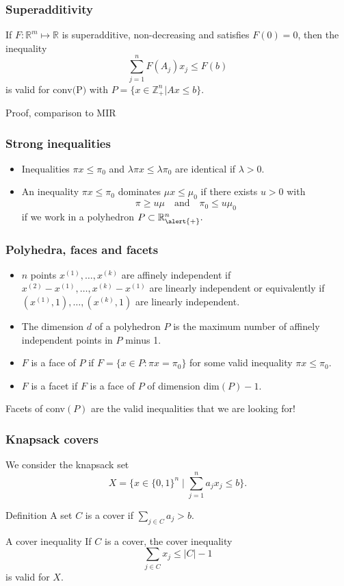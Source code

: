\documentclass[9pt,handout]{beamer}
\begin{document}
  \begin{frame} \frametitle{Superadditivity}
   \begin{block} {}
     If $F : \mathbb{R}^m \mapsto \mathbb{R}$ is superadditive, non-decreasing and satisfies $F(0) = 0$, then the inequality 
      $$ \sum_{j=1}^n F(A_j)x_j \leq F(b)$$ is valid for $\text{conv(P)}$ with $P = \{x\in \mathbb{Z}^n_+ | Ax \leq b\}$.
   \end{block}

   Proof, comparison to MIR

 \end{frame}


\begin{frame}
\frametitle{Strong inequalities}
\begin{itemize}
\item<1-> Inequalities $\pi x\leq \pi_0$ and $\lambda \pi x\leq \lambda \pi_0$
are \alert{identical} if $\lambda>0$.\bigskip
\item<1-> An inequality $\pi x \leq \pi_0$ \alert{dominates}
$\mu x\leq \mu_0$ if there exists $u>0$ with
$$ \pi\geq u\mu\quad \text{and}\quad \pi_0\leq u\mu_0$$
if we work in a polyhedron $P\subset \mathbb R^n_{\alert{+}}.$
\end{itemize}
\end{frame}
\begin{frame}
\frametitle{Polyhedra, faces and facets}
\begin{itemize}
\item $n$ points $x^{(1)},\ldots, x^{(k)}$ are \alert{affinely independent} 
if $x^{(2)}-x^{(1)},\ldots, x^{(k)}-x^{(1)}$ are \alert{linearly independent}
or equivalently if $(x^{(1)},1),\ldots,(x^{(k)},1)$ are \alert{linearly independent}.
\bigskip
\item The \alert{dimension} $d$ of a polyhedron $P$ is the maximum  number
of affinely independent points  in $P$ \alert{minus 1}.
\bigskip
\item $F$ is a \alert{face} of $P$ if $F=\{x\in P: \pi x=\pi_0\}$
for some valid inequality $\pi x\leq \pi_0$.
\bigskip
\item $F$ is a \alert{facet} if $F$ is a face of $P$ of dimension \alert{dim$(P) -1$}.
\end{itemize}
Facets of conv$(P)$ are the valid inequalities that we are looking for!
\end{frame}
\begin{frame}
\frametitle{Knapsack covers}
We consider the knapsack set
$$X=\{x\in \{0,1\}^n\mid \sum_{j=1}^n a_j x_j\leq b\}.$$
\begin{block}{Definition}
A set $C$ is a \alert{cover} if $\sum_{j\in C} a_j > b$.
\end{block}
\begin{block}{A cover inequality}
If $C$ is a cover, the cover inequality
$$\sum_{j\in C} x_j \leq |C|-1$$
is valid for $X$.
\end{block}
\end{frame}
\end{document}
